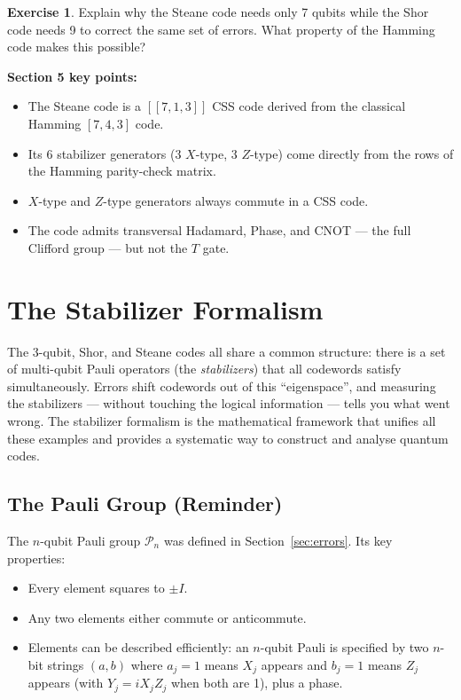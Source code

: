 \documentclass[11pt, a4paper]{article}
\theoremstyle{definition}
\newtheorem{exercise}{Exercise}[section]
\theoremstyle{plain}
\theoremstyle{remark}
\newcommand{\code}[1]{[\![#1]\!]}
\begin{document}
\begin{exercise}
Explain why the Steane code needs only 7 qubits while the Shor code needs 9
to correct the same set of errors.  What property of the Hamming code makes
this possible?
\end{exercise}

\begin{summarybox}
\textbf{Section 5 key points:}
\begin{itemize}
  \item The Steane code is a $\code{7,1,3}$ CSS code derived from the
        classical Hamming $[7,4,3]$ code.
  \item Its 6 stabilizer generators (3 $X$-type, 3 $Z$-type) come directly
        from the rows of the Hamming parity-check matrix.
  \item $X$-type and $Z$-type generators always commute in a CSS code.
  \item The code admits transversal Hadamard, Phase, and CNOT --- the full
        Clifford group --- but not the $T$ gate.
\end{itemize}
\end{summarybox}

\newpage
\section{The Stabilizer Formalism}
\label{sec:stabilizer}

\begin{intuition}
The 3-qubit, Shor, and Steane codes all share a common structure: there is a
set of multi-qubit Pauli operators (the \emph{stabilizers}) that all
codewords satisfy simultaneously.  Errors shift codewords out of this
``eigenspace'', and measuring the stabilizers --- without touching the
logical information --- tells you what went wrong.  The stabilizer formalism
is the mathematical framework that unifies all these examples and provides a
systematic way to construct and analyse quantum codes.
\end{intuition}

\subsection{The Pauli Group (Reminder)}

The $n$-qubit Pauli group $\mathcal{P}_n$ was defined in
Section~\ref{sec:errors}.  Its key properties:
\begin{itemize}
  \item Every element squares to $\pm I$.
  \item Any two elements either commute or anticommute.
  \item Elements can be described efficiently: an $n$-qubit Pauli is
        specified by two $n$-bit strings $(a, b)$ where $a_j = 1$ means
        $X_j$ appears and $b_j = 1$ means $Z_j$ appears (with $Y_j = iX_jZ_j$
        when both are 1), plus a phase.
\end{itemize}
\end{document}
